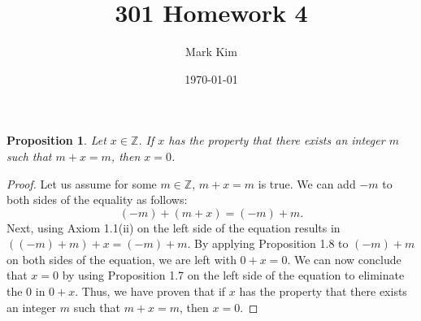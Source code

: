 \documentclass[12pt]{amsart}
\title{301 Homework 4}
\author{Mark Kim}
\date{\today}
\newcommand{\Z}{\mathbb{Z}}
\newtheorem*{proposition}{Proposition}
\begin{document}
\maketitle

\begin{proposition}
Let $x\in\Z$. If $x$ has the property that there exists an integer $m$ such that $m+x=m$, then $x=0$.
\end{proposition}

\begin{proof}
Let us assume for some $m\in\Z$, $m+x=m$ is true. We can add $-m$ to both sides of the equality as follows: \[ (-m)+(m+x)=(-m)+m. \] Next, using Axiom 1.1(ii) on the left side of the equation results in $((-m)+m)+x=(-m)+m$.  By applying Proposition 1.8 to $(-m)+m$ on both sides of the equation, we are left with $0+x=0$. We can now conclude that $x=0$ by using Proposition 1.7 on the left side of the equation to eliminate the $0$ in $0+x$.  Thus, we have proven that if $x$ has the property that there exists an integer $m$ such that $m+x=m$, then $x=0$.
\end{proof}
\end{document}
